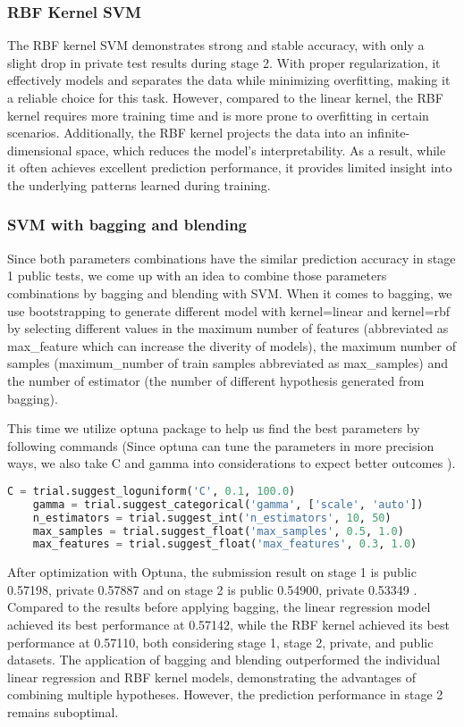 \subsubsection*{RBF Kernel SVM}
\quad The RBF kernel SVM demonstrates strong and stable accuracy, 
with only a slight drop in private test results during stage 2. 
With proper regularization, it effectively models and separates the data while minimizing overfitting, 
making it a reliable choice for this task. However, compared to the linear kernel, 
the RBF kernel requires more training time and is more prone to overfitting in certain scenarios. 
Additionally, the RBF kernel projects the data into an infinite-dimensional space, 
which reduces the model's interpretability. As a result, while it often achieves excellent prediction performance, 
it provides limited insight into the underlying patterns learned during training.



\subsubsection*{SVM with bagging and blending}

\quad Since both parameters combinations have the similar prediction accuracy in stage 1 public tests, we come up with an idea to combine those parameters combinations by 
bagging and blending with SVM. When it comes to bagging, we use bootstrapping to generate different model  
with kernel=linear and kernel=rbf by selecting different values in the maximum number of features 
(abbreviated as max\_feature which can increase the diverity of models), the maximum number of samples (maximum\_number of train samples 
abbreviated as max\_samples) and the number of estimator (the number of different hypothesis generated from bagging).

This time we utilize optuna package to help us find the best parameters by following commands 
(Since optuna can tune the parameters in more precision ways, we also take C and gamma into considerations to expect better outcomes ).
\begin{lstlisting}[language=Python]
    C = trial.suggest_loguniform('C', 0.1, 100.0)
    gamma = trial.suggest_categorical('gamma', ['scale', 'auto'])
    n_estimators = trial.suggest_int('n_estimators', 10, 50)
    max_samples = trial.suggest_float('max_samples', 0.5, 1.0)
    max_features = trial.suggest_float('max_features', 0.3, 1.0)
\end{lstlisting}
\quad After optimization with Optuna, the submission result 
on stage 1 is public 0.57198, private 0.57887 and 
on stage 2 is public 0.54900, private 0.53349 . 
Compared to the results before applying bagging, 
the linear regression model achieved its best performance at 0.57142, 
while the RBF kernel achieved its best performance at 0.57110, both considering stage 1, stage 2, private, and public datasets.
The application of bagging and blending outperformed the individual linear regression and RBF kernel models,
demonstrating the advantages of combining multiple hypotheses. 
However, the prediction performance in stage 2 remains suboptimal.

